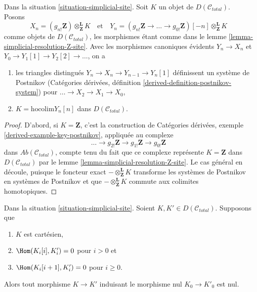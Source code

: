 \begin{lemma}
\label{lemma-abelian-postnikov}
Dans la situation \ref{situation-simplicial-site}. Soit $K$
un objet de $D(\mathcal{C}_{total})$. Posons
$$
X_n = (g_{n!}\mathbf{Z})
\otimes^\mathbf{L}_\mathbf{Z} K
\quad\text{et}\quad
Y_n =
(g_{n!}\mathbf{Z} \to \ldots \to g_{0!}\mathbf{Z})[-n]
\otimes^\mathbf{L}_\mathbf{Z} K
$$
comme objets de $D(\mathcal{C}_{total})$, les morphismes étant
comme dans le lemme \ref{lemma-simplicial-resolution-Z-site}.
Avec les morphismes canoniques évidents $Y_n \to X_n$ et
$Y_0 \to Y_1[1] \to Y_2[2] \to \ldots$, on a
\begin{enumerate}
\item les triangles distingués $Y_n \to X_n \to Y_{n - 1} \to Y_n[1]$
définissent un système de Postnikov
(Catégories dérivées, définition \ref{derived-definition-postnikov-system})
pour $\ldots \to X_2 \to X_1 \to X_0$,
\item $K = \text{hocolim} Y_n[n]$ dans $D(\mathcal{C}_{total})$.
\end{enumerate}
\end{lemma}

\begin{proof}
D'abord, si $K = \mathbf{Z}$, c'est la construction de
Catégories dérivées, exemple \ref{derived-example-key-postnikov},
appliquée au complexe
$$
\ldots \to
g_{2!}\mathbf{Z} \to
g_{1!}\mathbf{Z} \to
g_{0!}\mathbf{Z}
$$
dans $\textit{Ab}(\mathcal{C}_{total})$, compte tenu du fait que
ce complexe représente $K = \mathbf{Z}$ dans $D(\mathcal{C}_{total})$
par le lemme \ref{lemma-simplicial-resolution-Z-site}.
Le cas général en découle, puisque le foncteur exact
$- \otimes^\mathbf{L}_\mathbf{Z} K$ transforme les systèmes de Postnikov en
systèmes de Postnikov et
que $- \otimes^\mathbf{L}_\mathbf{Z} K$ commute aux colimites homotopiques.
\end{proof}

\begin{lemma}
\label{lemma-nullity-cartesian-objects-derived}
Dans la situation \ref{situation-simplicial-site}.
Soient $K, K' \in D(\mathcal{C}_{total})$.
Supposons que
\begin{enumerate}
\item $K$ est cartésien,
\item $\Hom(K_i[i], K'_i) = 0$ pour $i > 0$ et
\item $\Hom(K_i[i + 1], K'_i) = 0$ pour $i \geq 0$.
\end{enumerate}
Alors tout morphisme $K \to K'$ induisant le morphisme nul $K_0 \to K'_0$ est nul.
\end{lemma}

